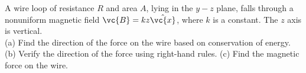 A wire loop of resistance $R$ and area $A$, lying in the $y-z$ plane, falls through a
nonuniform magnetic field $\vc{B}=kz\hat{\vc{x}}$, where $k$ is a constant. The $z$ axis is
vertical.\\
(a) Find the direction of the force on the wire based on conservation of energy.\hwendpart
(b) Verify the direction of the force using right-hand rules.\hwendpart
(c) Find the magnetic force on the wire.\answercheck
